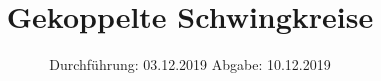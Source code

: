 
\usepackage{physics}
\subject{355}
\title{Gekoppelte Schwingkreise}
\date{%
  Durchführung: 03.12.2019
  \hspace{3em}
  Abgabe: 10.12.2019
}




\maketitle
\thispagestyle{empty}
\tableofcontents
\newpage
\nocite{V355}






\printbibliography{}


